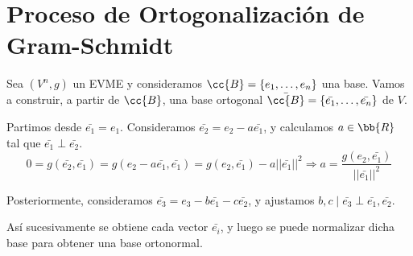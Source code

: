 \begin{comment}
\begin{definicion}[Ángulo orientado]
    Sean $u,v\in V^3$ linealmente independientes. Tenemos que el ángulo orientado se define como $\theta $
\end{definicion}
\end{comment}

\section{Proceso de Ortogonalización de Gram-Schmidt}

Sea $(V^n, g)$ un EVME y consideramos $\cc{B}=\{e_1, \dots, e_n\}$ una base. Vamos a construir, a partir de $\cc{B}$, una base ortogonal $\bar{\cc{B}}=\{\bar{e_1}, \dots, \bar{e_n}\}$ de $V$.

Partimos desde $\bar{e_1} = e_1$. Consideramos $\bar{e_2} = e_2 -a\bar{e_1}$, y calculamos $a\in \bb{R}$ tal que $\bar{e_1} \perp \bar{e_2}$.
\begin{equation*}
    0=g(\bar{e_2}, \bar{e_1}) = g(e_2-a\bar{e_1}, \bar{e_1})=  g(e_2, \bar{e_1}) -a ||\bar{e_1}||^2
    \Longrightarrow a = \frac{g(e_2, \bar{e_1})}{||\bar{e_1}||^2}
\end{equation*}

Posteriormente, consideramos $\bar{e_3} = e_3 -b\bar{e_1} -c\bar{e_2}$, y ajustamos $b,c\mid \bar{e_3}\perp \bar{e_1},\bar{e_2}$.

Así sucesivamente se obtiene cada vector $\bar{e_i}$, y luego se puede normalizar dicha base para obtener una base ortonormal.

